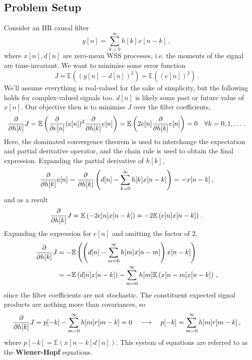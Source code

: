 \subsection{Problem Setup}
%
Consider an IIR causal filter
%
\begin{displaymath}
  y[n] = \sum_{k=0}^\infty h[k]x[n-k] \,,
\end{displaymath}
%
where $x[n], d[n]$ are zero-mean WSS processes, i.e. the moments of
the signal are time-invariant. We want to minimise some error
function
%
\begin{displaymath}
  J = \mathbb{E}\left((y[n] - d[n])^2\right) = \mathbb{E}\left((e[n])^2\right) \,.
\end{displaymath}
%
We'll assume everything is real-valued for the sake of simplicity,
but the following holds for complex-valued signals too. $d[n]$ is
likely some past or future value of $x[n]$. Our objective then is
to minimise $J$ over the filter coefficients,
%
\begin{displaymath}
  \frac{\partial}{\partial h[k]} J = \mathbb{E}\left(\frac{\partial}{\partial e[n]}(e[n])^2\frac{\partial}{\partial h[k]}e[n]\right)
  = \mathbb{E}\left(2e[n]\frac{\partial}{\partial h[k]}e[n]\right) = 0
  \quad \forall k = 0, 1, \hdots\,.
\end{displaymath}
%
Here, the dominated convergence theorem is used to interchange the
expectation and partial derivative operator, and the chain rule is
used to obtain the final expression. Expanding the partial derivative
of $h[k]$,
%
\begin{displaymath}
  \frac{\partial}{\partial h[k]}e[n] = \frac{\partial}{\partial h[k]}\left(d[n] - \sum_{k=0}^\infty h[k]x[n-k]\right)
  = - x[n-k] \,,
\end{displaymath}
%
and as a result
%
\begin{displaymath}
  \frac{\partial}{\partial h[k]}J = \mathbb{E}\left(-2e[n]x[n-k]\right) = -2\mathbb{E}\left(e[n]x[n-k]\right) \,.
\end{displaymath}
%
Expanding the expression for $e[n]$ and omitting the factor of $2$,
%
\begin{align*}
  \frac{\partial}{\partial h[k]}J &= -\mathbb{E}\left(\left(d[n] - \sum_{m=0}^\infty h[m]x[n-m]\right)x[n-k]\right) \\
  &= -\mathbb{E}\left(d[n]x[n-k]\right) - \sum_{m=0}^\infty h[m]\mathbb{E}\left(x[n-m]x[n-k]\right) \,,
\end{align*}
%
since the filter coefficients are not stochastic. The constituent expected signal products
are nothing more than covariances, so
%
\begin{displaymath}
  \frac{\partial}{\partial h[k]}J = p[-k] - \sum_{m=0}^\infty h[m]r[m-k] = 0
  \quad\longrightarrow\quad
  p[-k] = \sum_{m=0}^\infty h[m]r[m-k] \,,
\end{displaymath}
%
where $p[-k] = \mathbb{E}(x[n-k]d[n])$. This system of equations are referred to
as the \textbf{Wiener-Hopf} equations.

